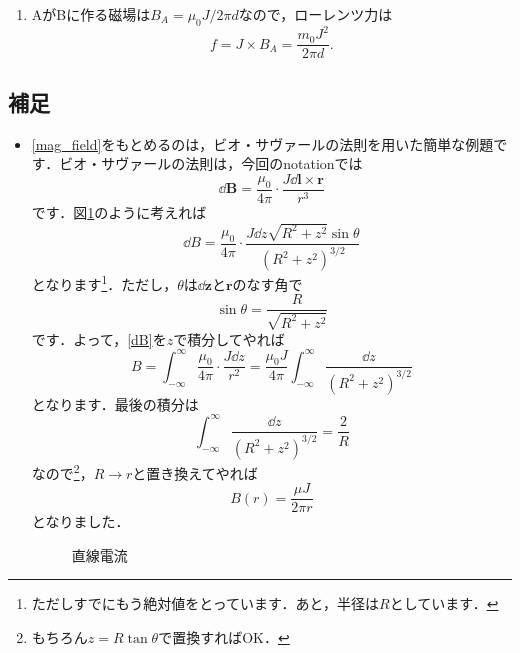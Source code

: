 \documentclass[a4paper,pdflatex,ja=standard]{bxjsarticle}
\begin{document}
\begin{enumerate}
  \item 
  AがBに作る磁場は$B_{A}=\mu_0J/2\pi d$なので，ローレンツ力は
  \begin{equation}
    f
    =
    J\times B_A
    =
    \frac{m_0 J^2}{2\pi d}
    .
  \end{equation}

\end{enumerate}

\clearpage
\subsection*{補足}
\begin{itemize}
  \item 
  \eqref{mag_field}をもとめるのは，ビオ・サヴァールの法則を用いた簡単な例題です．ビオ・サヴァールの法則は，今回のnotationでは
  \begin{equation}
    \dd \bm{B}
    =
    \frac{\mu_{0}}{4\pi}\cdot\frac{J\dd \bm{l}\times\bm{r}}{r^3}
  \end{equation}
  です．図\ref{current}のように考えれば
  \begin{equation}
    \dd B
    =
    \frac{\mu_{0}}{4\pi}
    \cdot
    \frac{J\dd z\sqrt{R^2 + z^2}\sin\theta}{(R^2+z^2)^{3/2}}
    \label{dB}
  \end{equation}
  となります\footnote{
    ただしすでにもう絶対値をとっています．あと，半径は$R$としています．
  }．ただし，$\theta$は$\dd \bm{z}$と$\bm{r}$のなす角で
  \begin{equation}
    \sin\theta
    =
    \frac{R}{\sqrt{R^2+z^2}}
  \end{equation}
  です．よって，\eqref{dB}を$z$で積分してやれば
  \begin{equation}
    B
    =
    \int_{-\infty}^{\infty}\frac{\mu_{0}}{4\pi}\cdot\frac{J\dd z}{r^2}
    =
    \frac{\mu_{0}J}{4\pi}\int_{-\infty}^{\infty}
    \frac{\dd z}{(R^2 +z^2)^{3/2}}    
  \end{equation}
  となります．最後の積分は
  \begin{equation}
    \int_{-\infty}^{\infty}
    \frac{\dd z}{(R^2 +z^2)^{3/2}}
    =
    \frac{2}{R}
  \end{equation}
  なので\footnote{
    もちろん$z=R\tan\theta$で置換すればOK．
  }，$R\rightarrow r$と置き換えてやれば
  \begin{equation}
    B(r)
    =
    \frac{\mu J}{2\pi r}
  \end{equation}
  となりました．

  \begin{figure}[ht]
    \centering
    \caption{直線電流}
    \label{current}
  \end{figure}

\end{itemize}
\end{document}

